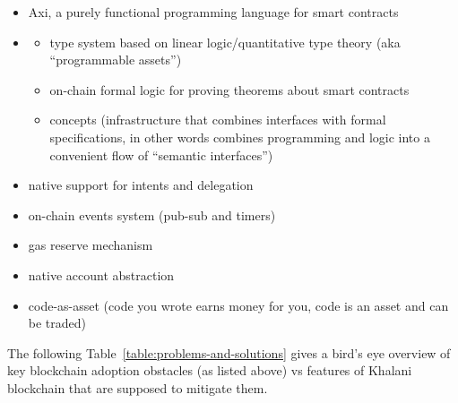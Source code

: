 \documentclass[a4paper]{article}
\begin{document}
\begin{itemize}
  \item Axi, a purely functional programming language for smart contracts
  \item \begin{itemize}
    \item type system based on linear logic/quantitative type theory (aka ``programmable assets'')
    \item on-chain formal logic for proving theorems about smart contracts
    \item concepts (infrastructure that combines interfaces with formal specifications, in other words combines programming and logic into a convenient flow of ``semantic interfaces'')
  \end{itemize}
\item native support for intents and delegation
\item on-chain events system (pub-sub and timers)
\item gas reserve mechanism
\item native account abstraction
\item code-as-asset (code you wrote earns money for you, code is an asset and can be traded)
\end{itemize}

The following Table~\ref{table:problems-and-solutions} gives a bird’s eye overview of key blockchain adoption obstacles (as listed above) vs features of Khalani blockchain that are supposed to mitigate them.
\end{document}
